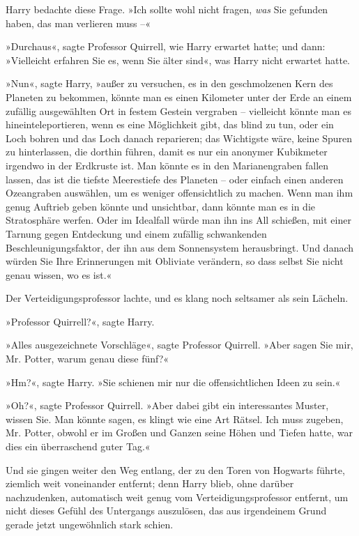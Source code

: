 {Harry bedachte diese Frage. »Ich sollte wohl nicht fragen, \emph{was} Sie gefunden haben, das man verlieren muss --«

»Durchaus«, sagte Professor Quirrell, wie Harry erwartet hatte; und dann: »Vielleicht erfahren Sie es, wenn Sie älter sind«, was Harry nicht erwartet hatte.

»Nun«, sagte Harry, »außer zu versuchen, es in den geschmolzenen Kern des Planeten zu bekommen, könnte man es einen Kilometer unter der Erde an einem zufällig ausgewählten Ort in festem Gestein vergraben -- vielleicht könnte man es hineinteleportieren, wenn es eine Möglichkeit gibt, das blind zu tun, oder ein Loch bohren und das Loch danach reparieren; das Wichtigste wäre, keine Spuren zu hinterlassen, die dorthin führen, damit es nur ein anonymer Kubikmeter irgendwo in der Erdkruste ist. Man könnte es in den Marianengraben fallen lassen, das ist die tiefste Meerestiefe des Planeten -- oder einfach einen anderen Ozeangraben auswählen, um es weniger offensichtlich zu machen. Wenn man ihm genug Auftrieb geben könnte und unsichtbar, dann könnte man es in die Stratosphäre werfen. Oder im Idealfall würde man ihn ins All schießen, mit einer Tarnung gegen Entdeckung und einem zufällig schwankenden Beschleunigungsfaktor, der ihn aus dem Sonnensystem herausbringt. Und danach würden Sie Ihre Erinnerungen mit Obliviate verändern, so dass selbst Sie nicht genau wissen, wo es ist.«

Der Verteidigungsprofessor lachte, und es klang noch seltsamer als sein Lächeln.

»Professor Quirrell?«, sagte Harry.

»Alles ausgezeichnete Vorschläge«, sagte Professor Quirrell. »Aber sagen Sie mir, Mr. Potter, warum genau diese fünf?«

»Hm?«, sagte Harry. »Sie schienen mir nur die offensichtlichen Ideen zu sein.«

»Oh?«, sagte Professor Quirrell. »Aber dabei gibt ein interessantes Muster, wissen Sie. Man könnte sagen, es klingt wie eine Art Rätsel. Ich muss zugeben, Mr. Potter, obwohl er im Großen und Ganzen seine Höhen und Tiefen hatte, war dies ein überraschend guter Tag.«

Und sie gingen weiter den Weg entlang, der zu den Toren von Hogwarts führte, ziemlich weit voneinander entfernt; denn Harry blieb, ohne darüber nachzudenken, automatisch weit genug vom Verteidigungsprofessor entfernt, um nicht dieses Gefühl des Untergangs auszulösen, das aus irgendeinem Grund gerade jetzt ungewöhnlich stark schien.

}
